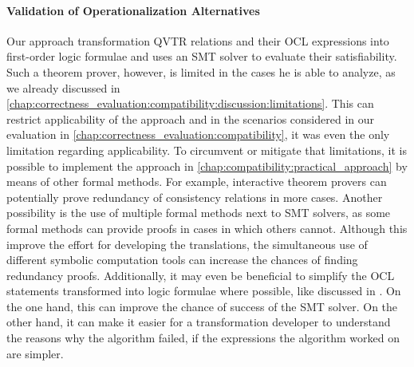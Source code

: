 \paragraph{Validation of Operationalization Alternatives}
\label{chap:futurework:correctness:compatibility:alternatives}
Our approach transformation \gls{QVTR} relations and their \gls{OCL} expressions into first-order logic formulae and uses an \gls{SMT} solver to evaluate their satisfiability.
Such a theorem prover, however, is limited in the cases he is able to analyze, as we already discussed in \autoref{chap:correctness_evaluation:compatibility:discussion:limitations}.
This can restrict applicability of the approach and in the scenarios considered in our evaluation in \autoref{chap:correctness_evaluation:compatibility}, it was even the only limitation regarding applicability.
To circumvent or mitigate that limitations, it is possible to implement the approach in \autoref{chap:compatibility:practical_approach} by means of other formal methods. 
For example, interactive theorem provers can potentially prove redundancy of consistency relations in more cases. 
Another possibility is the use of multiple formal methods next to \gls{SMT} solvers, as some formal methods can provide proofs in cases in which others cannot.
Although this improve the effort for developing the translations, the simultaneous use of different symbolic computation tools can increase the chances of finding redundancy proofs.
Additionally, it may even be beneficial to simplify the \gls{OCL} statements transformed into logic formulae where possible, like discussed in \textcite{cuadrado2019OclOptimization-SoSym}.
On the one hand, this can improve the chance of success of the \gls{SMT} solver.
On the other hand, it can make it easier for a transformation developer to understand the reasons why the algorithm failed, if the expressions the algorithm worked on are simpler.


